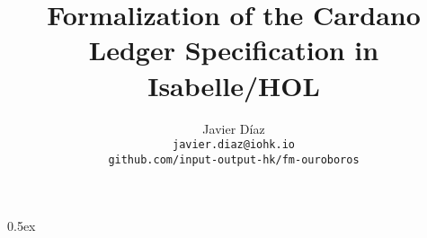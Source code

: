 \documentclass[a4paper,11pt]{article}
\begin{document}
\title{Formalization of the Cardano Ledger Specification in Isabelle/HOL}
\author{Javier D\'iaz\\\small\texttt{javier.diaz@iohk.io}\\\small\texttt{github.com/input-output-hk/fm-ouroboros}}

\maketitle

\tableofcontents

\parindent 0pt\parskip 0.5ex


\end{document}
